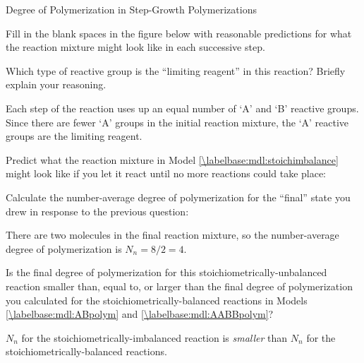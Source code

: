 \begin{activity}{Degree of Polymerization in Step-Growth Polymerizations}
\begin{ctqs}
		\question Fill in the blank spaces in the figure below with reasonable predictions for what the reaction mixture might look like in each successive step.
		
			\begin{solution}[1in]
			\end{solution}
		
		\clearpage
		\question Which type of reactive group is the ``limiting reagent'' in this reaction?  Briefly explain your reasoning.
		
			\begin{solution}[1in]
				Each step of the reaction uses up an equal number of `A' and `B' reactive groups. Since there are fewer `A' groups in the initial reaction mixture, the `A' reactive groups are the limiting reagent.
			\end{solution}
		
		\question \label{\labelbase:ctq:nonstoichpredict} Predict what the reaction mixture in Model \ref{\labelbase:mdl:stoichimbalance} might look like if you let it react until no more reactions could take place:
		
\begin{solution}
\end{solution}
		
		\question Calculate the number-average degree of polymerization for the ``final'' state you drew in response to the previous question:
		
		\begin{solution}[1in]
			There are two molecules in the final reaction mixture, so the number-average degree of polymerization is $N_n = 8/2 = 4$.
		\end{solution}
		
		\question Is the final degree of polymerization for this stoichiometrically-unbalanced reaction smaller than, equal to, or larger than the final degree of polymerization you calculated for the stoichiometrically-balanced reactions in Models \ref{\labelbase:mdl:ABpolym} and \ref{\labelbase:mdl:AABBpolym}?
		
		\begin{solution}[1in]
			$N_n$ for the stoichiometrically-imbalanced reaction is \emph{smaller} than $N_n$ for the stoichiometrically-balanced reactions.
		\end{solution}
		

\end{ctqs}
\end{activity}
